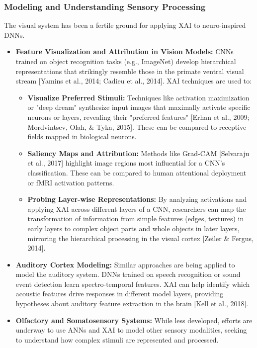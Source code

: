 \documentclass[11pt,a4paper]{article}
\begin{document}
\subsubsection{Modeling and Understanding Sensory Processing}
The visual system has been a fertile ground for applying XAI to neuro-inspired DNNs.
\begin{itemize}
    \item \textbf{Feature Visualization and Attribution in Vision Models:} CNNs trained on object recognition tasks (e.g., ImageNet) develop hierarchical representations that strikingly resemble those in the primate ventral visual stream [Yamins et al., 2014; Cadieu et al., 2014]. XAI techniques are used to:
        \begin{itemize}
            \item \textbf{Visualize Preferred Stimuli:} Techniques like activation maximization or "deep dream" synthesize input images that maximally activate specific neurons or layers, revealing their "preferred features" [Erhan et al., 2009; Mordvintsev, Olah, \& Tyka, 2015]. These can be compared to receptive fields mapped in biological neurons.
            \item \textbf{Saliency Maps and Attribution:} Methods like Grad-CAM [Selvaraju et al., 2017] highlight image regions most influential for a CNN's classification. These can be compared to human attentional deployment or fMRI activation patterns.
            \item \textbf{Probing Layer-wise Representations:} By analyzing activations and applying XAI across different layers of a CNN, researchers can map the transformation of information from simple features (edges, textures) in early layers to complex object parts and whole objects in later layers, mirroring the hierarchical processing in the visual cortex [Zeiler \& Fergus, 2014].
        \end{itemize}
    \item \textbf{Auditory Cortex Modeling:} Similar approaches are being applied to model the auditory system. DNNs trained on speech recognition or sound event detection learn spectro-temporal features. XAI can help identify which acoustic features drive responses in different model layers, providing hypotheses about auditory feature extraction in the brain [Kell et al., 2018].
    \item \textbf{Olfactory and Somatosensory Systems:} While less developed, efforts are underway to use ANNs and XAI to model other sensory modalities, seeking to understand how complex stimuli are represented and processed.
\end{itemize}
\end{document}

